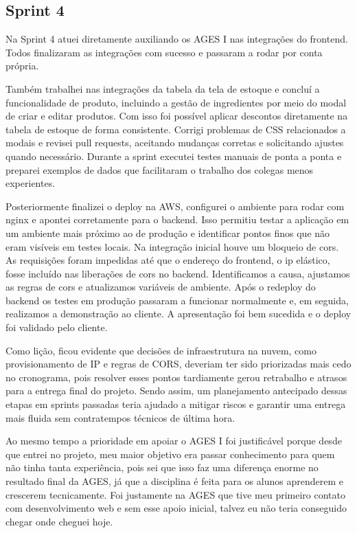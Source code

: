 \subsection{Sprint 4}
 
Na Sprint 4 atuei diretamente auxiliando os AGES I nas integrações do frontend. Todos finalizaram as integrações com sucesso e passaram a rodar por conta própria.

Também trabalhei nas integrações da tabela da tela de estoque e concluí a funcionalidade de produto, incluindo a gestão de ingredientes por meio do modal de criar e editar produtos. Com isso foi possível aplicar descontos diretamente na tabela de estoque de forma consistente. Corrigi problemas de CSS relacionados a modais e revisei pull requests, aceitando mudanças corretas e solicitando ajustes quando necessário. Durante a sprint executei testes manuais de ponta a ponta e preparei exemplos de dados que facilitaram o trabalho dos colegas menos experientes.

Posteriormente finalizei o deploy na AWS, configurei o ambiente para rodar com \ac{nginx} e apontei corretamente para o backend. Isso permitiu testar a aplicação em um ambiente mais próximo ao de produção e identificar pontos finos que não eram visíveis em testes locais. Na integração inicial houve um bloqueio de \ac{cors}. As requisições foram impedidas até que o endereço do frontend, o \ac{ip} elástico, fosse incluído nas liberações de \ac{cors} no backend. Identificamos a causa, ajustamos as regras de \ac{cors} e atualizamos variáveis de ambiente. Após o redeploy do backend os testes em produção passaram a funcionar normalmente e, em seguida, realizamos a demonstração ao cliente. A apresentação foi bem sucedida e o deploy foi validado pelo cliente.

Como lição, ficou evidente que decisões de infraestrutura na nuvem, como provisionamento de IP e regras de CORS, deveriam ter sido priorizadas mais cedo no cronograma, pois resolver esses pontos tardiamente gerou retrabalho e atrasos para a entrega final do projeto. Sendo assim, um planejamento antecipado dessas etapas em sprints passadas teria ajudado a mitigar riscos e garantir uma entrega mais fluida sem contratempos técnicos de última hora.

Ao mesmo tempo a prioridade em apoiar o AGES I foi justificável porque desde que entrei no projeto, meu maior objetivo era passar conhecimento para quem não tinha tanta experiência, pois sei que isso faz uma diferença enorme no resultado final da AGES, já que a disciplina é feita para os alunos aprenderem e crescerem tecnicamente. Foi justamente na AGES que tive meu primeiro contato com desenvolvimento web e sem esse apoio inicial, talvez eu não teria conseguido chegar onde cheguei hoje.
